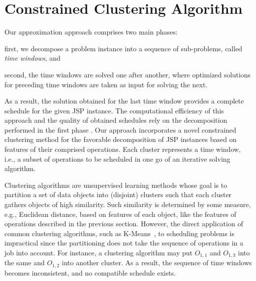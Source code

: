 \documentclass[runningheads]{llncs}
\begin{document}
\section{Constrained Clustering Algorithm}
\label{sec:method}
Our approximation approach comprises two main phases: 
\begin{enumerate*}[label=\emph{(\roman*)}]
  \item first, we decompose a problem instance into a sequence of sub-problems, called \emph{time windows}, and
  \item second, the time windows are solved one after another,
        where optimized solutions for preceding time windows are taken as input for solving the next.
\end{enumerate*}
As a result, the solution obtained for the last time window provides a complete schedule for the given JSP instance.
The computational efficiency of this approach and the quality of obtained schedules rely on the decomposition performed in the first phase \cite{zhang2010hybrid,zhai2014decomposition}. 
Our approach incorporates a novel constrained clustering method for the favorable decomposition of JSP instances based on features of their comprised operations. Each cluster represents a time window, i.e., a subset of operations to be scheduled in one go of an iterative solving algorithm.

Clustering algorithms are unsupervised learning methods whose goal is to partition a set of data objects into (disjoint) clusters such that each cluster gathers objects of high similarity. 
Such similarity is determined by some measure, e.g., Euclidean distance, based on features of each object, like the features of operations described in the previous section. 
However, the direct application of common clustering algorithms, such as K-Means~\cite{Forgy1965ClusterAO}, to scheduling problems is impractical since the partitioning does not take the sequence of operations in a job into account. For instance, a clustering algorithm may put $O_{1,1}$ and $O_{1,3}$ into the same and $O_{1,2}$ into another cluster. As a result, the sequence of time windows becomes inconsistent, and no compatible schedule exists.
\end{document}
